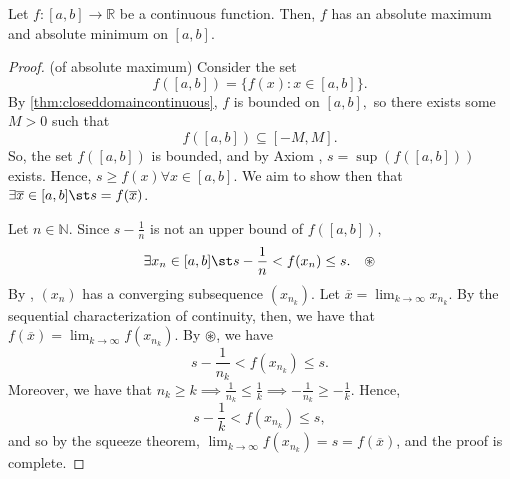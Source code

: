 \documentclass[12pt]{article}
\begin{document}
\begin{theorem}
  Let $f : [a, b] \to \mathbb{R}$ be a continuous function. Then, $f$ has an absolute maximum and absolute minimum on $[a, b]$.
\end{theorem}

\begin{proof}
  (of absolute maximum) Consider the set \[
  f([a, b]) = \{f (x) : x \in [a, b]\}.
  \]
  By \cref{thm:closeddomaincontinuous}, $f$ is bounded on $[a, b],$ so there exists some $M > 0$ such that $$
  f([a, b]) \subseteq [-M, M].
  $$So, the set $f([a,b])$ is bounded, and by Axiom , $s = \sup (f ([a,b]))$ exists. Hence, $s \geq f(x) \forall x \in [a, b]$. We aim to show then that $\exists \overline{x} \in [a, b] \st s = f(\overline{x})$.

  Let $n \in \mathbb{N}$. Since $s - \frac{1}{n}$ is not an upper bound of $f([a, b])$, $$\exists x_n \in [a, b] \st s - \frac{1}{n} < f(x_n) \leq s. \quad \circledast$$
  By , $(x_n)$ has a converging subsequence $(x_{n_k})$. Let $\overline{x} = \lim_{k\to\infty} x_{n_{k}}$. By the sequential characterization of continuity, then, we have that $f(\overline{x}) = \lim_{k\to\infty} f(x_{n_k})$. By $\circledast$, we have \[
  s - \frac{1}{n_k} < f(x_{n_k}) \leq s.
  \]
  Moreover, we have that $n_k \geq k \implies \frac{1}{n_k} \leq \frac{1}{k} \implies - \frac{1}{n_k} \geq -\frac{1}{k}$. Hence, $$s - \frac{1}{k} < f(x_{n_k}) \leq s,$$ and so by the squeeze theorem, $\lim_{k\to\infty} f(x_{n_k}) = s = f(\overline{x})$, and the proof is complete.
\end{proof}
\end{document}

